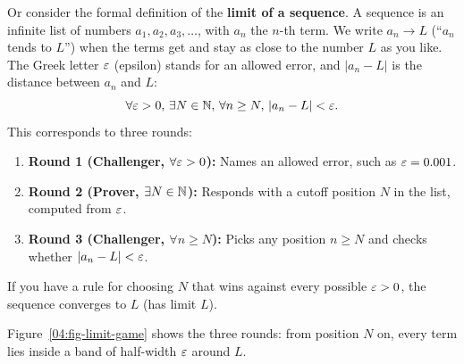 Or consider the formal definition of the \textbf{limit of a sequence}. A sequence is an infinite list of numbers $a_1, a_2, a_3, \ldots$, with $a_n$ the $n$-th term. We write $a_n \to L$ (``$a_n$ tends to $L$'') when the terms get and stay as close to the number $L$ as you like. The Greek letter $\varepsilon$ (epsilon) stands for an allowed error, and $|a_n - L|$ is the distance between $a_n$ and $L$:
\[
\forall \varepsilon > 0, \, \exists N \in \mathbb{N}, \, \forall n \ge N, \, |a_n - L| < \varepsilon.
\]
This corresponds to three rounds:
\begin{enumerate}
\item \textbf{Round 1 (Challenger, $\forall \varepsilon > 0$):} Names an allowed error, such as $\varepsilon = 0.001$.
\item \textbf{Round 2 (Prover, $\exists N \in \mathbb{N}$):} Responds with a cutoff position $N$ in the list, computed from $\varepsilon$.
\item \textbf{Round 3 (Challenger, $\forall n \ge N$):} Picks any position $n \ge N$ and checks whether $|a_n - L| < \varepsilon$.
\end{enumerate}
If you have a rule for choosing $N$ that wins against every possible $\varepsilon > 0$, the sequence converges to $L$ (has limit $L$).

Figure~\ref{04:fig-limit-game} shows the three rounds: from position $N$ on, every term lies inside a band of half-width $\varepsilon$ around $L$.

